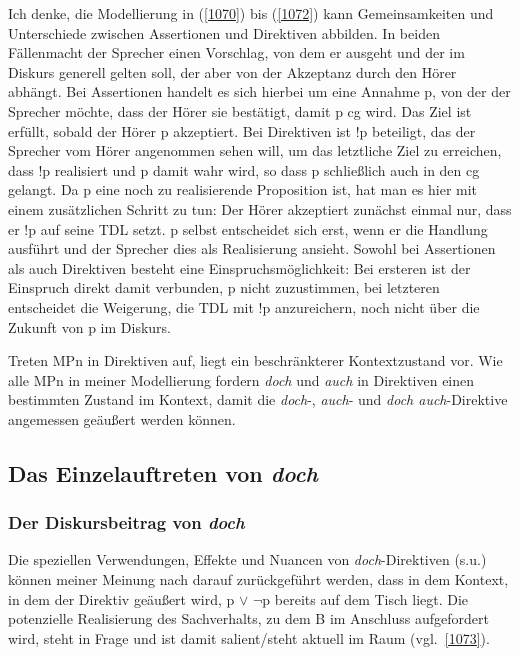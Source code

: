 Ich denke, die Modellierung in (\ref{1070}) bis (\ref{1072}) kann Gemeinsamkeiten und Unterschiede zwischen Assertionen  und Direktiven  abbilden. In beiden Fällen\linebreak macht der Sprecher einen Vorschlag, von dem er ausgeht und der im Diskurs generell gelten soll, der aber von der Akzeptanz durch den Hörer abhängt. Bei Assertionen handelt es sich hierbei um eine Annahme p, von der der Sprecher möchte, dass der Hörer sie bestätigt, damit p cg wird. Das Ziel ist erfüllt, sobald der Hörer p akzeptiert. Bei Direktiven ist !p beteiligt, das der Sprecher vom Hörer angenommen sehen will, um das letztliche Ziel zu erreichen, dass !p realisiert und p damit wahr wird, so dass p schließlich auch in den cg gelangt. Da p eine noch zu rea\-lisierende Proposition ist, hat man es hier mit einem zusätzlichen Schritt zu tun: Der Hörer akzeptiert zunächst einmal nur, dass er !p auf seine TDL setzt. p selbst entscheidet sich erst, wenn er die Handlung ausführt und der Sprecher dies als Realisierung ansieht. Sowohl bei Assertionen als auch Direktiven besteht eine Einspruchsmöglichkeit: Bei ersteren ist der Einspruch direkt damit verbunden, p nicht zuzustimmen, bei letzteren entscheidet die Weigerung, die TDL mit !p anzureichern, noch nicht über die Zukunft von p im Diskurs. 

Treten MPn in Direktiven auf, liegt ein beschränkterer Kontextzustand vor. Wie alle MPn in meiner Modellierung fordern \textit{doch} und \textit{auch} in Direktiven einen bestimmten Zustand im Kontext, damit die \textit{doch}-, \textit{auch}- und \textit{doch auch}-Direktive angemessen geäußert werden können. 

\subsection{Das Einzelauftreten von \textit{doch}}
\subsubsection{Der Diskursbeitrag von \textit{doch}}
Die speziellen Verwendungen, Effekte und Nuancen von \textit{doch}-Direktiven (s.u.) können meiner Meinung nach darauf zurückgeführt werden, dass in dem Kontext, in dem der Direktiv geäußert wird, p $\vee$ $\neg$p bereits auf dem Tisch liegt. Die potenzielle Realisierung des Sachverhalts, zu dem B im Anschluss aufgefordert wird, steht in Frage und ist damit salient/steht aktuell im Raum (vgl.\ \ref{1073}).

